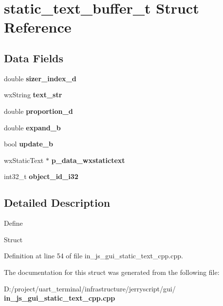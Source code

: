 \section{static\+\_\+text\+\_\+buffer\+\_\+t Struct Reference}
\label{structstatic__text__buffer__t}
\subsection*{Data Fields}
\begin{DoxyCompactItemize}
\item 
\mbox{\label{structstatic__text__buffer__t_aae99f717aadbf88f890c71a293468af8}} 
double {\bfseries sizer\+\_\+index\+\_\+d}
\item 
\mbox{\label{structstatic__text__buffer__t_ae027b01a16a8b9ded760f0ead4d7a951}} 
wx\+String {\bfseries text\+\_\+str}
\item 
\mbox{\label{structstatic__text__buffer__t_a93e3ac3895fbb25863fb66af78e0ed39}} 
double {\bfseries proportion\+\_\+d}
\item 
\mbox{\label{structstatic__text__buffer__t_a40506be5f1249944fed816e11465f5ca}} 
double {\bfseries expand\+\_\+b}
\item 
\mbox{\label{structstatic__text__buffer__t_a4aed9ad79f44786d35de6f7804904494}} 
bool {\bfseries update\+\_\+b}
\item 
\mbox{\label{structstatic__text__buffer__t_aae497bb46e2813656d1ad5a00a02deaf}} 
wx\+Static\+Text $\ast$ {\bfseries p\+\_\+data\+\_\+wxstatictext}
\item 
\mbox{\label{structstatic__text__buffer__t_aa7683407966206b7eb17d410ee75d880}} 
int32\+\_\+t {\bfseries object\+\_\+id\+\_\+i32}
\end{DoxyCompactItemize}


\subsection{Detailed Description}
Define

Struct 

Definition at line 54 of file in\+\_\+js\+\_\+gui\+\_\+static\+\_\+text\+\_\+cpp.\+cpp.



The documentation for this struct was generated from the following file\+:\begin{DoxyCompactItemize}
\item 
D\+:/project/uart\+\_\+terminal/infrastructure/jerryscript/gui/\textbf{ in\+\_\+js\+\_\+gui\+\_\+static\+\_\+text\+\_\+cpp.\+cpp}\end{DoxyCompactItemize}

